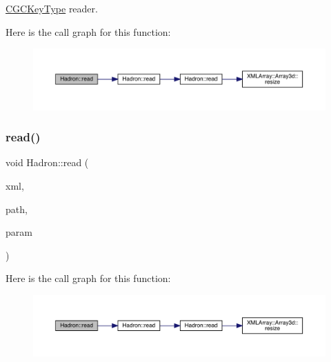 \mbox{\hyperlink{structHadron_1_1CGCKeyType}{C\+G\+C\+Key\+Type}} reader. 

Here is the call graph for this function\+:\nopagebreak
\begin{figure}[H]
\begin{center}
\leavevmode
\includegraphics[width=350pt]{d1/daf/namespaceHadron_ad89b4230ad913b777ca725473df40d15_cgraph}
\end{center}
\end{figure}
\mbox{\label{namespaceHadron_aef0c0dfd0f87842b485511132f1c405f}} 
\subsubsection{\texorpdfstring{read()}{read()}\hspace{0.1cm}{\footnotesize\ttfamily [14/94]}}
{\footnotesize\ttfamily void Hadron\+::read (\begin{DoxyParamCaption}\item[{\mbox{\hyperlink{classADATXML_1_1XMLReader}{X\+M\+L\+Reader}} \&}]{xml,  }\item[{const std\+::string \&}]{path,  }\item[{\mbox{\hyperlink{structHadron_1_1KeyHadronNPartNPtCorr__t_1_1NPoint__t}{Key\+Hadron\+N\+Part\+N\+Pt\+Corr\+\_\+t\+::\+N\+Point\+\_\+t}} \&}]{param }\end{DoxyParamCaption})}

Here is the call graph for this function\+:\nopagebreak
\begin{figure}[H]
\begin{center}
\leavevmode
\includegraphics[width=350pt]{d1/daf/namespaceHadron_aef0c0dfd0f87842b485511132f1c405f_cgraph}
\end{center}
\end{figure}
\mbox{\label{namespaceHadron_aa4df93329eeddeec176cd9df5abe9ce1}} 
